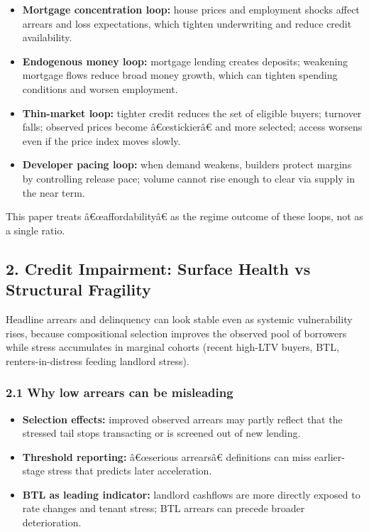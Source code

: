 \begin{itemize}
\tightlist
\item
  \textbf{Mortgage concentration loop:} house prices and employment
  shocks affect arrears and loss expectations, which tighten
  underwriting and reduce credit availability.
\item
  \textbf{Endogenous money loop:} mortgage lending creates deposits;
  weakening mortgage flows reduce broad money growth, which can tighten
  spending conditions and worsen employment.
\item
  \textbf{Thin-market loop:} tighter credit reduces the set of eligible
  buyers; turnover falls; observed prices become â€œstickierâ€ and more
  selected; access worsens even if the price index moves slowly.
\item
  \textbf{Developer pacing loop:} when demand weakens, builders protect
  margins by controlling release pace; volume cannot rise enough to
  clear via supply in the near term.
\end{itemize}

This paper treats â€œaffordabilityâ€ as the regime outcome of these
loops, not as a single ratio.

\subsection{2. Credit Impairment: Surface Health vs Structural
Fragility}\label{credit-impairment-surface-health-vs-structural-fragility}

Headline arrears and delinquency can look stable even as systemic
vulnerability rises, because compositional selection improves the
observed pool of borrowers while stress accumulates in marginal cohorts
(recent high-LTV buyers, BTL, renters-in-distress feeding landlord
stress).

\subsubsection{2.1 Why low arrears can be
misleading}\label{why-low-arrears-can-be-misleading}

\begin{itemize}
\tightlist
\item
  \textbf{Selection effects:} improved observed arrears may partly
  reflect that the stressed tail stops transacting or is screened out of
  new lending.
\item
  \textbf{Threshold reporting:} â€œserious arrearsâ€ definitions can
  miss earlier-stage stress that predicts later acceleration.
\item
  \textbf{BTL as leading indicator:} landlord cashflows are more
  directly exposed to rate changes and tenant stress; BTL arrears can
  precede broader deterioration.
\end{itemize}

